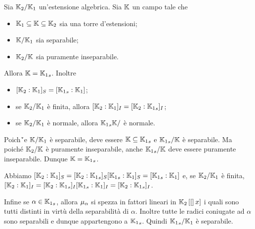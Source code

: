 \begin{Theorem}
	Sia $\mathbb{K}_2/\mathbb{K}_1$ un'estensione algebrica. Sia $\mathbb{K}$ un campo tale che
	\begin{itemize}
		\item $\mathbb{K}_1 \subseteq \mathbb{K} \subseteq \mathbb{K}_2$ sia una torre d'estensioni;
		\item $\mathbb{K}/\mathbb{K}_1$ sia separabile;
		\item $\mathbb{K}_2/\mathbb{K}$ sia puramente inseparabile.
	\end{itemize}
	Allora $\Field = \SeparableClosure{\Field_1}$. Inoltre
	\begin{itemize}
		\item $\SeparableDegree{\Field_2}{\Field_1} = \FieldDegree{\SeparableClosure{\Field_1}}{\Field_1}$;
		\item se $\mathbb{K}_2/\mathbb{K}_1$ \`e finita, allora $\UnseparableDegree{\Field_2}{\Field_1} = \UnseparableDegree{\Field_2}{\SeparableClosure{\Field_1}}$;
		\item se $\mathbb{K}_2/\mathbb{K}_1$ \`e normale, allora $\FieldExtension{\SeparableClosure{\Field_1}{\Field}}$ \`e normale.
	\end{itemize}
\end{Theorem}
\Proof Poich\'`e $\mathbb{K}/\mathbb{K}_1$ \`e separabile, deve essere $\Field \subseteq \SeparableClosure{\Field_1}$ e $\FieldExtension{\SeparableClosure{\Field_1}}{\Field}$ \`e separabile. Ma poich\'e $\mathbb{K}_2/\mathbb{K}$ \`e puramente inseparabile, anche $\FieldExtension{\SeparableClosure{\Field_1}}{\Field}$ deve essere puramente inseparabile. Dunque $\Field = \SeparableClosure{\Field_1}$.
\par Abbiamo $\SeparableDegree{\Field_2}{\Field_1} = \SeparableDegree{\Field_2}{\SeparableClosure{\Field_1}}\SeparableDegree{\SeparableClosure{\Field_1}}{\Field_1} = \FieldDegree{\SeparableClosure{\Field_1}}{\Field_1}$ e, se $\mathbb{K}_2/\mathbb{K}_1$ \`e finita, $\UnseparableDegree{\Field_2}{\Field_1} = \UnseparableDegree{\Field_2}{\SeparableClosure{\Field_1}}\UnseparableDegree{\SeparableClosure{\Field_1}}{\Field_1} = \UnseparableDegree{\Field_2}{\SeparableClosure{\Field_1}}$.
\par Infine se $\alpha \in \SeparableClosure{\Field_1}$, allora $\MinimalPolynomial{\alpha}$ si spezza in fattori lineari in $\mathbb{K}_2 \left [ [ \right ]x]$ i quali sono tutti distinti in virt\`u della separabilit\`a di $\alpha$. Inoltre tutte le radici coniugate ad $\alpha$ sono separabili e dunque appartengono a $\SeparableClosure{\Field_1}$. Quindi $\FieldExtension{\SeparableClosure{\Field_1}}{\Field_1}$ \`e separabile. \EndProof
